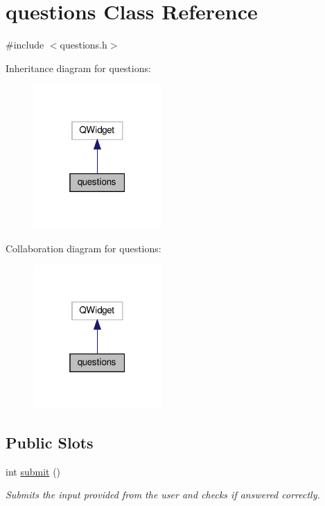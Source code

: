 \hypertarget{classquestions}{}\section{questions Class Reference}
\label{classquestions}


{\ttfamily \#include $<$questions.\+h$>$}



Inheritance diagram for questions\+:
\nopagebreak
\begin{figure}[H]
\begin{center}
\leavevmode
\includegraphics[width=139pt]{classquestions__inherit__graph}
\end{center}
\end{figure}


Collaboration diagram for questions\+:
\nopagebreak
\begin{figure}[H]
\begin{center}
\leavevmode
\includegraphics[width=139pt]{classquestions__coll__graph}
\end{center}
\end{figure}
\subsection*{Public Slots}
\begin{DoxyCompactItemize}
\item 
int \hyperlink{classquestions_a6425653b765e9a7bf937907c32b15e4b}{submit} ()
\begin{DoxyCompactList}\small\item\em Submits the input provided from the user and checks if answered correctly. \end{DoxyCompactList}\end{DoxyCompactItemize}
